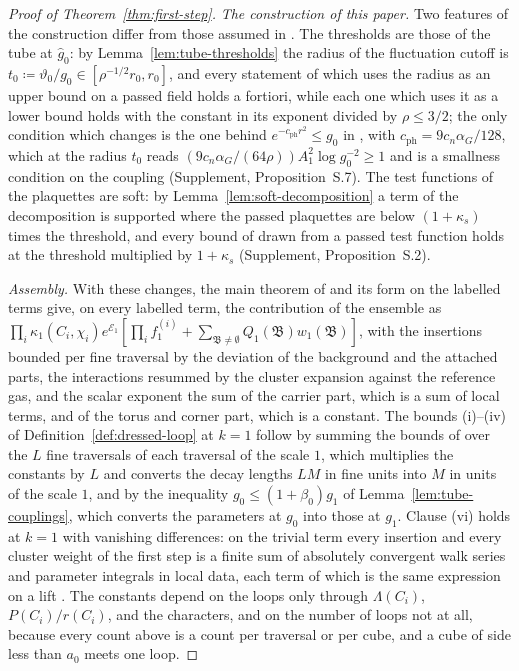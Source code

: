 \documentclass[11pt]{preprint}
\numberwithin{equation}{section}
\theoremstyle{definition}
\theoremstyle{remark}
\theoremstyle{plain}
\begin{document}
\begin{proof}[Proof of Theorem~\ref{thm:first-step}]
\emph{The construction of this paper.} Two features of the construction differ from those assumed in \cite{WilsonFirstStep}. The thresholds are those of the tube at $\hat g_0$: by Lemma~\ref{lem:tube-thresholds} the radius of the fluctuation cutoff is $t_0 \coloneqq \vartheta_0/g_0 \in [\rho^{-1/2}r_0, r_0]$, and every statement of \cite{WilsonFirstStep} which uses the radius as an upper bound on a passed field holds a fortiori, while each one which uses it as a lower bound holds with the constant in its exponent divided by $\rho \leq 3/2$; the only condition which changes is the one behind $e^{-c_{\mathrm{ph}}r^2} \leq g_0$ in \cite[(9.29)(iii)]{WilsonFirstStep}, with $c_{\mathrm{ph}} = 9c_n\alpha_G/128$, which at the radius $t_0$ reads $(9c_n\alpha_G/(64\rho))A_1^2\log g_0^{-2} \geq 1$ and is a smallness condition on the coupling (Supplement, Proposition~S.7). The test functions of the plaquettes are soft: by Lemma~\ref{lem:soft-decomposition} a term of the decomposition is supported where the passed plaquettes are below $(1 + \kappa_s)$ times the threshold, and every bound of \cite{WilsonFirstStep} drawn from a passed test function holds at the threshold multiplied by $1 + \kappa_s$ (Supplement, Proposition~S.2).

\emph{Assembly.} With these changes, the main theorem of \cite{WilsonFirstStep} and its form on the labelled terms give, on every labelled term, the contribution of the ensemble as $\prod_i\kappa_1(C_i, \chi_i)e^{\mathcal E_1}[\prod_if^{(i)}_1 + \sum_{\mathfrak B \neq \emptyset}Q_1(\mathfrak B)w_1(\mathfrak B)]$, with the insertions bounded per fine traversal by the deviation of the background and the attached parts, the interactions resummed by the cluster expansion against the reference gas, and the scalar exponent the sum of the carrier part, which is a sum of local terms, and of the torus and corner part, which is a constant. The bounds (i)--(iv) of Definition~\ref{def:dressed-loop} at $k = 1$ follow by summing the bounds of \cite{WilsonFirstStep} over the $L$ fine traversals of each traversal of the scale $1$, which multiplies the constants by $L$ and converts the decay lengths $LM$ in fine units into $M$ in units of the scale $1$, and by the inequality $g_0 \leq (1 + \beta_0)g_1$ of Lemma~\ref{lem:tube-couplings}, which converts the parameters at $g_0$ into those at $g_1$. Clause (vi) holds at $k = 1$ with vanishing differences: on the trivial term every insertion and every cluster weight of the first step is a finite sum of absolutely convergent walk series and parameter integrals in local data, each term of which is the same expression on a lift \cite[Sections~E.9.2 and~E.10.4]{WilsonFirstStep}. The constants depend on the loops only through $\Lambda(C_i)$, $P(C_i)/r(C_i)$, and the characters, and on the number of loops not at all, because every count above is a count per traversal or per cube, and a cube of side less than $a_0$ meets one loop.
\end{proof}
\end{document}
